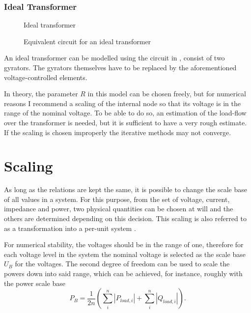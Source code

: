 \newpage

\subsubsection{Ideal Transformer}

\begin{figure}
	\centering
	
	\caption{Ideal transformer}
	\label{fig:ideal_transformer_original}
\end{figure}

\begin{figure}
	\centering
	
	\caption{Equivalent circuit for an ideal transformer}
	\label{fig:ideal_transformer_equivalent}
\end{figure}

An ideal transformer  can be modelled using the circuit in , consist of two gyrators. The gyrators themselves have to be replaced by the aforementioned voltage-controlled elements.

In theory, the parameter $R$ in this model can be chosen freely, but for numerical reasons I recommend a scaling of the internal node so that its voltage is in the range of the nominal voltage. To be able to do so, an estimation of the load-flow over the transformer is needed, but it is sufficient to have a very rough estimate. If the scaling is chosen improperly the iterative methods may not converge.

\section{Scaling}
\label{sec:scaling}

As long as the relations are kept the same, it is possible to change the scale base of all values in a system. For this purpose, from the set of voltage, current, impedance and power, two physical quantities can be chosen at will and the others are determined depending on this decision. This scaling is also referred to as a transformation into a per-unit system \citep[p. 90]{powerSystemAnalysis}.

For numerical stability, the voltages should be in the range of one, therefore for each voltage level in the system the nominal voltage is selected as the scale base $U_B$ for the voltages. The second degree of freedom can be used to scale the powers down into said range, which can be achieved, for instance, roughly with the power scale base
\begin{equation}
	P_B = \frac{1}{2n} \left( \sum_{i}^n \left| P_{load,i} \right| + \sum_{i}^n \left| Q_{load,i} \right| \right).
\end{equation}

